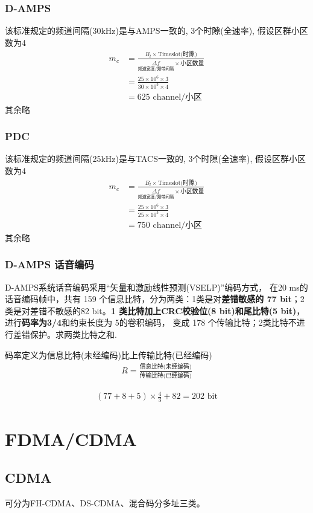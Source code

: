 \documentclass[a4paper]{report}
\begin{document}
\subsection{D-AMPS}
该标准规定的频道间隔(30kHz)是与AMPS一致的, 3个时隙(全速率), 假设区群小区数为4
\begin{align*}
	m_c&=\frac{B_t\times \text{Timeslot(时隙)}}{\underset{\text{频道宽度/频带间隔}}{\Delta f}\times \text{小区数量}} \\
	&=\frac{25\times 10^6\times 3}{30\times 10^3\times 4}\\
	&= 625 \text{ channel/小区}
\end{align*}
其余略
\subsection{PDC}
该标准规定的频道间隔(25kHz)是与TACS一致的, 3个时隙(全速率), 假设区群小区数为4
\begin{align*}
	m_c&=\frac{B_t\times \text{Timeslot(时隙)}}{\underset{\text{频道宽度/频带间隔}}{\Delta f}\times \text{小区数量}} \\
	&=\frac{25\times 10^6\times 3}{25\times 10^3\times 4}\\
	&= 750 \text{ channel/小区}
\end{align*}
其余略

\subsection{D-AMPS 话音编码}
D-AMPS系统话音编码采用“矢量和激励线性预测(VSELP)”编码方式， 在20 ms的话音编码帧中，共有 159 个信息比特，分为两类：1类是对\textbf{差错敏感的 77 bit}；2 类是对差错不敏感的82 bit。\textbf{1 类比特加上CRC校验位(8 bit)和尾比特(5 bit)}，进行\textbf{码率为3/4}和约束长度为 5的卷积编码， 变成 178 个传输比特；2类比特不进行差错保护。求两类比特之和. 

码率定义为信息比特(未经编码)比上传输比特(已经编码)
\begin{align*}
	R=\frac{\text{信息比特(未经编码)}}{\text{传输比特(已经编码)}}
\end{align*}

\begin{align*}
	(77+8+5)\times \frac{4}{3}+82=202\text{ bit}
\end{align*}
\chapter{FDMA/CDMA}
\section{CDMA}
可分为FH-CDMA、DS-CDMA、混合码分多址三类。
\end{document}
